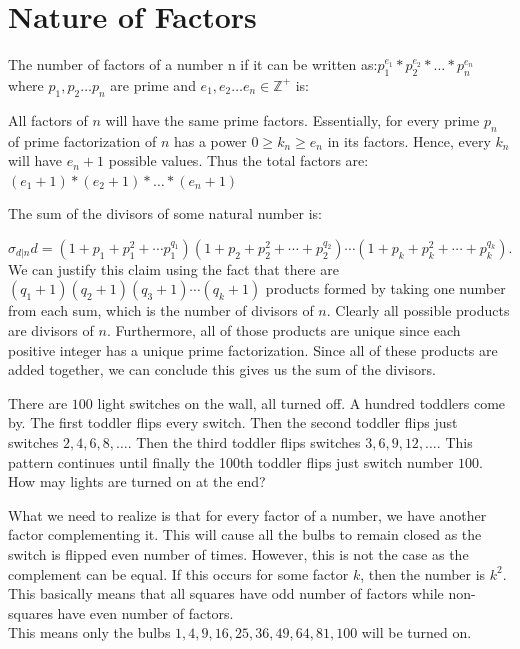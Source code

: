 \section{Nature of Factors}
\begin{example}
    The number of factors of a number n if it can be written as:$p_1^{e_1}*p_2^{e_2}*\dots *p_n^{e_n}$ where $p_1, p_2 \dots p_n$ are prime and $e_1, e_2 \dots e_n \in \mathbb{Z^+}$ is:
\end{example}
All factors of $n$ will have the same prime factors. Essentially, for every prime $p_n$ of prime factorization of $n$ has a power $0 \geq k_n \geq e_n$ in its factors. Hence, every $k_n$ will have $e_n + 1$ possible values. Thus the total factors are: $(e_1+1)*(e_2+1)*\dots *(e_n+1)$\\
\begin{example}
The sum of the divisors of some natural number is:    
\end{example}
$\sigma_{d|n}d = (1 + p_1 + p_1^2 +\cdots p_1^{q_1})(1 + p_2 + p_2^2 + \cdots + p_2^{q_2}) \cdots (1 + p_k + p_k^2 + \cdots + p_k^{q_k}).$\\
We can justify this claim using the fact that there are $(q_1+1)(q_2+1)(q_3+1)\cdots (q_k+1)$ products formed by taking one number from each sum, which is the number of divisors of $n$. Clearly all possible products are divisors of $n$. Furthermore, all of those products are unique since each positive integer has a unique prime factorization. Since all of these products are added together, we can conclude this gives us the sum of the divisors.\\
\begin{example}
There are $100$ light switches on the wall, all turned off. A hundred toddlers come by. The first toddler flips every switch. Then the second toddler flips just switches $2, 4, 6, 8, \dots$. Then the third toddler flips switches $3, 6, 9, 12, \dots$. This pattern continues until finally the 100th toddler flips just switch number $100$. How may lights are turned on at the end?
\end{example}
What we need to realize is that for every factor of a number, we have another factor complementing it. This will cause all the bulbs to remain closed as the switch is flipped even number of times. However, this is not the case as the complement can be equal. If this occurs for some factor $k$, then the number is $k^2$. This basically means that all squares have odd number of factors while non-squares have even number of factors.\\
This means only the bulbs $1,4,9,16,25,36,49,64,81,100$ will be turned on.\\
